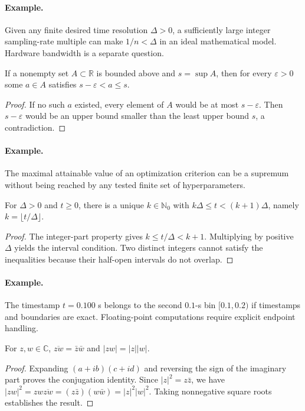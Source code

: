 \paragraph{Example.} Given any finite desired time resolution $\Delta>0$, a sufficiently large integer sampling-rate multiple can make $1/n<\Delta$ in an ideal mathematical model. Hardware bandwidth is a separate question.

\begin{proposition}If a nonempty set $A\subset\mathbb R$ is bounded above and $s=\sup A$, then for every $\varepsilon>0$ some $a\in A$ satisfies $s-\varepsilon<a\leq s$.\end{proposition}
\begin{proof}If no such $a$ existed, every element of $A$ would be at most $s-\varepsilon$. Then $s-\varepsilon$ would be an upper bound smaller than the least upper bound $s$, a contradiction.\end{proof}
\paragraph{Example.} The maximal attainable value of an optimization criterion can be a supremum without being reached by any tested finite set of hyperparameters.

\begin{proposition}For $\Delta>0$ and $t\geq0$, there is a unique $k\in\mathbb N_0$ with $k\Delta\leq t<(k+1)\Delta$, namely $k=\lfloor t/\Delta\rfloor$.\end{proposition}
\begin{proof}The integer-part property gives $k\leq t/\Delta<k+1$. Multiplying by positive $\Delta$ yields the interval condition. Two distinct integers cannot satisfy the inequalities because their half-open intervals do not overlap.\end{proof}
\paragraph{Example.} The timestamp $t=0.100$ s belongs to the second $0.1$-s bin $[0.1,0.2)$ if timestamps and boundaries are exact. Floating-point computations require explicit endpoint handling.

\begin{proposition}For $z,w\in\mathbb C$, $\overline{zw}=\bar z\bar w$ and $|zw|=|z||w|$.\end{proposition}
\begin{proof}Expanding $(a+ib)(c+id)$ and reversing the sign of the imaginary part proves the conjugation identity. Since $|z|^2=z\bar z$, we have $|zw|^2=zw\overline{zw}=(z\bar z)(w\bar w)=|z|^2|w|^2$. Taking nonnegative square roots establishes the result.\end{proof}
